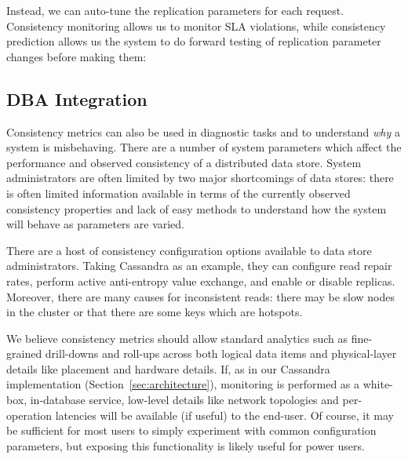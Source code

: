 Instead, we can auto-tune the replication parameters for each
request. Consistency monitoring allows us to monitor SLA violations,
while consistency prediction allows us the system to do forward testing of
replication parameter changes before making them:


\subsection{DBA Integration}
\label{sec:dba}

Consistency metrics can also be used in diagnostic tasks and to
understand \textit{why} a system is misbehaving. There are a number of
system parameters which affect the performance and observed
consistency of a distributed data store. System administrators are
often limited by two major shortcomings of data stores: there is often
limited information available in terms of the currently observed
consistency properties and lack of easy methods to understand how the
system will behave as parameters are varied.


There are a host of consistency configuration options available to
data store administrators. Taking Cassandra as an example, they can
configure read repair rates, perform active anti-entropy value
exchange, and enable or disable replicas. Moreover, there are many
causes for inconsistent reads: there may be slow nodes in the cluster
or that there are some keys which are hotspots.


We believe consistency metrics should allow standard analytics such as
fine-grained drill-downs and roll-ups across both logical data items
and physical-layer details like placement and hardware details. If, as
in our Cassandra implementation (Section~\ref{sec:architecture}),
monitoring is performed as a white-box, in-database service, low-level
details like network topologies and per-operation latencies will be
available (if useful) to the end-user. Of course, it may be sufficient
for most users to simply experiment with common configuration
parameters, but exposing this functionality is likely useful for power
users.

